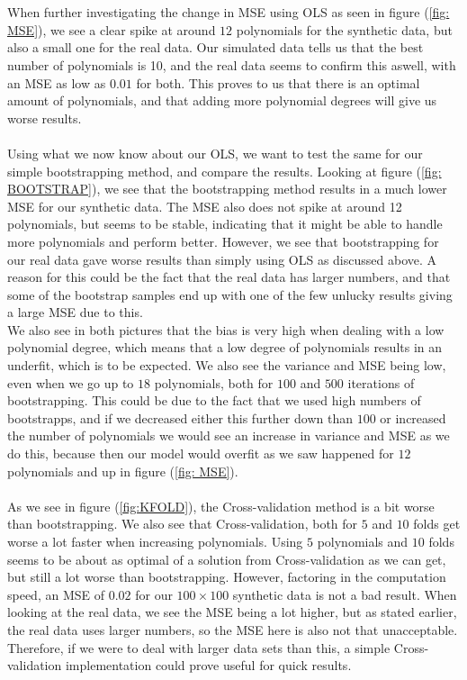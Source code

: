 \documentclass[english,notitlepage,reprint,nofootinbib]{revtex4-1}  %
\begin{document}
\\
\\
When further investigating the change in MSE using OLS as seen in figure (\ref{fig: MSE}), we see a clear spike at around $12$ polynomials for the synthetic data, but also a small one for the real data. Our simulated data tells us that the best number of polynomials is 10, and the real data seems to confirm this aswell, with an MSE as low as $0.01$ for both. This proves to us that there is an optimal amount of polynomials, and that adding more polynomial degrees will give us worse results.
\\
\\
Using what we now know about our OLS, we want to test the same for our simple bootstrapping method, and compare the results. Looking at figure (\ref{fig: BOOTSTRAP}), we see that the bootstrapping method results in a much lower MSE for our synthetic data. The MSE also does not spike at around 12 polynomials, but seems to be stable, indicating that it might be able to handle more polynomials and perform better. However, we see that bootstrapping for our real data gave worse results than simply using OLS as discussed above. A reason for this could be the fact that the real data has larger numbers, and that some of the bootstrap samples end up with one of the few unlucky results giving a large MSE due to this.
\\
We also see in both pictures that the bias is very high when dealing with a low polynomial degree, which means that a low degree of polynomials results in an underfit, which is to be expected. We also see the variance and MSE being low, even when we go up to $18$ polynomials, both for $100$ and $500$ iterations of bootstrapping. This could be due to the fact that we used high numbers of bootstrapps, and if we decreased either this further down than $100$ or increased the number of polynomials we would see an increase in variance and MSE as we do this, because then our model would overfit as we saw happened for $12$ polynomials and up in figure (\ref{fig: MSE}).
\\
\\
As we see in figure (\ref{fig:KFOLD}), the Cross-validation method is a bit worse than bootstrapping. We also see that Cross-validation, both for $5$ and $10$ folds get worse a lot faster when increasing polynomials. Using $5$ polynomials and $10$ folds seems to be about as optimal of a solution from Cross-validation as we can get, but still a lot worse than bootstrapping. However, factoring in the computation speed, an MSE of $0.02$ for our $100 \times 100$ synthetic data is not a bad result. When looking at the real data, we see the MSE being a lot higher, but as stated earlier, the real data uses larger numbers, so the MSE here is also not that unacceptable. Therefore, if we were to deal with larger data sets than this, a simple Cross-validation implementation could prove useful for quick results.
\end{document}
